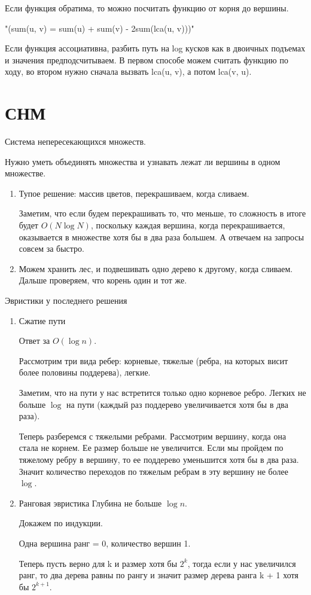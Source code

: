 Если функция обратима, то можно посчитать функцию от корня до вершины. 

\cpp"(sum(u, v) = sum(u) + sum(v) - 2sum(lca(u, v)))"

Если функция ассоциативна, разбить путь на log кусков как в двоичных подъемах и значения предподсчитываем. 
В первом способе можем считать функцию по ходу, во втором нужно сначала вызвать lca(u, v), а потом lca(v, u).
\section{СНМ}
Система непересекающихся множеств.

Нужно уметь объединять множества и узнавать лежат ли вершины в одном множестве. 

\begin{enumerate}
\item
Тупое решение: массив цветов, перекрашиваем, когда сливаем. 

Заметим, что если будем перекрашивать то, что меньше, то сложность в итоге будет $O(N \log N)$, поскольку 
каждая вершина, когда перекрашивается, оказывается в множестве хотя бы в два раза большем. А отвечаем на запросы совсем за быстро.
\item
Можем хранить лес, и подвешивать одно дерево к другому, когда сливаем. Дальше проверяем, что корень один и тот же.
\end{enumerate}

Эвристики у последнего решения
\begin {enumerate}
\item Сжатие пути

Ответ за $O(\log n)$.

Рассмотрим три вида ребер: корневые, тяжелые (ребра, на которых висит более половины поддерева), легкие.

Заметим, что на пути у нас встретится только одно корневое ребро. Легких
не больше $\log$ на пути (каждый раз поддерево увеличивается хотя бы в два раза).

Теперь разберемся с тяжелыми ребрами.
Рассмотрим вершину, когда она стала не корнем. Ее размер больше не увеличится. Если мы пройдем 
по тяжелому ребру в вершину, то ее поддерево уменьшится хотя бы в два раза. Значит количество переходов по тяжелым ребрам в эту вершину не более $\log$.

\item Ранговая эвристика
Глубина не больше $\log n$. 

Докажем по индукции. 

Одна вершина ранг = 0, количество вершин 1.

Теперь пусть верно для k и размер хотя бы $2^k$, тогда если 
у нас увеличился ранг, то  два дерева равны по рангу и значит размер 
дерева ранга k + 1 хотя бы $2^{k  + 1}$.

\end{enumerate}
